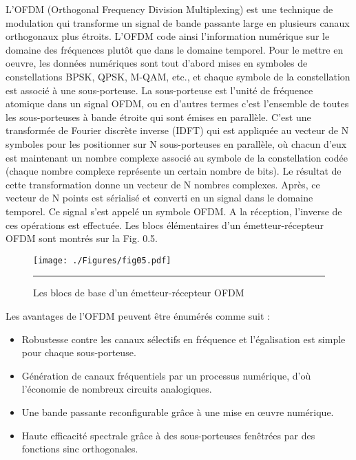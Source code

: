 L’OFDM (Orthogonal Frequency Division Multiplexing) est une technique de modulation qui transforme un signal de bande passante large en plusieurs canaux orthogonaux plus étroits. L’OFDM code ainsi l'information numérique sur le domaine des fréquences plutôt que dans le domaine temporel. Pour le mettre en oeuvre, les données numériques sont tout d'abord mises en symboles de constellations BPSK, QPSK, M-QAM, etc., et chaque symbole de la constellation est associé à une sous-porteuse. La sous-porteuse est l'unité de fréquence atomique dans un signal OFDM, ou en d'autres termes c’est l'ensemble de toutes les sous-porteuses à bande étroite qui sont émises en parallèle. C’est une transformée de Fourier discrète inverse (IDFT) qui est appliquée au vecteur de N symboles pour les positionner sur N sous-porteuses en parallèle, où chacun d'eux est maintenant un nombre complexe associé au symbole de la constellation codée (chaque nombre complexe représente un certain nombre de bits). Le résultat de cette transformation donne un vecteur de N nombres complexes. Après, ce vecteur de N points est sérialisé et converti en un signal dans le domaine temporel. Ce signal s'est appelé un symbole OFDM. A la réception, l'inverse de ces opérations est effectuée. Les blocs élémentaires d'un émetteur-récepteur OFDM sont montrés sur la Fig. 0.5.

\begin{figure}[htbp]
  \centering
    \texttt{[image: ./Figures/fig05.pdf]}
    \rule{35em}{0.5pt}
  \caption[Les blocs de base d'un émetteur-récepteur OFDM]{Les blocs de base d'un émetteur-récepteur OFDM}
  \label{fig:Electron}
\end{figure}

Les avantages de l'OFDM peuvent être énumérés comme suit :

\begin{itemize}
  \item Robustesse contre les canaux sélectifs en fréquence et l'égalisation est simple pour chaque sous-porteuse.
  \item Génération de canaux fréquentiels par un processus numérique, d'où l’économie de nombreux circuits analogiques.
  \item Une bande passante reconfigurable grâce à une mise en œuvre numérique.
  \item Haute efficacité spectrale grâce à des sous-porteuses fenêtrées par des fonctions sinc orthogonales.
\end{itemize}

